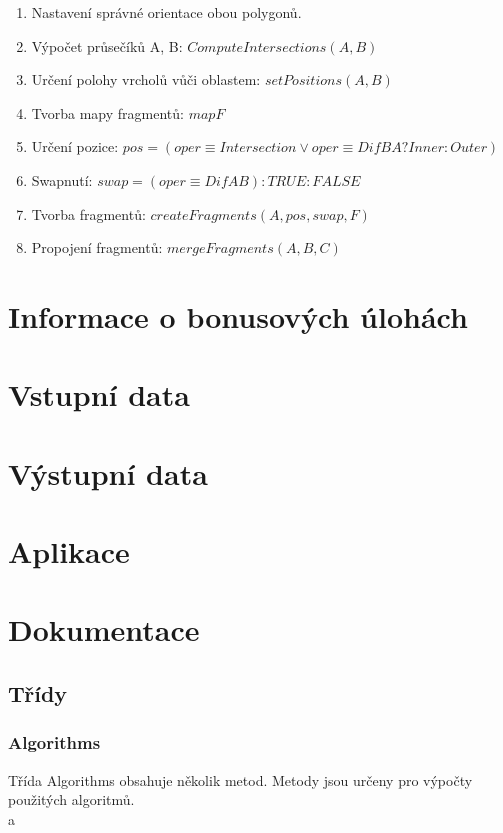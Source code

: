 \documentclass[a4paper, 12pt]{article}
\begin{document}
\begin{enumerate}
\item Nastavení správné orientace obou polygonů.
\item Výpočet průsečíků A, B: $ComputeIntersections(A, B)$
\item Určení polohy vrcholů vůči oblastem: $setPositions(A, B) $
\item Tvorba mapy fragmentů: $map F$
\item Určení pozice: $pos = (oper \equiv Intersection \lor oper \equiv DifBA?Inner:Outer ) $
\item Swapnutí: $swap = (oper \equiv DifAB) : TRUE : FALSE$
\item Tvorba fragmentů: $createFragments(A, pos, swap, F)$
\item Propojení fragmentů: $mergeFragments(A, B, C)$
\end{enumerate}



\section{Informace o bonusových úlohách}



\section{Vstupní data}



\section{Výstupní data}


\clearpage
\section{Aplikace}



\section{Dokumentace}
\subsection{Třídy}
\subsubsection{Algorithms}
Třída Algorithms obsahuje několik metod. Metody jsou určeny pro výpočty použitých algoritmů.
\\a
\end{document}
